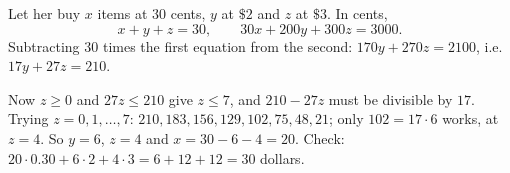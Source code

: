 Let her buy $x$ items at $30$ cents, $y$ at $\$2$ and $z$ at $\$3$. In cents,
\[
x+y+z=30,\qquad 30x+200y+300z=3000 .
\]
Subtracting $30$ times the first equation from the second: $170y+270z=2100$, i.e.\ $17y+27z=210$.

Now $z\ge0$ and $27z\le210$ give $z\le7$, and $210-27z$ must be divisible by $17$. Trying $z=0,1,\dots,7$: $210,183,156,129,102,75,48,21$; only $102=17\cdot6$ works, at $z=4$. So $y=6$, $z=4$ and $x=30-6-4=\boxed{20}$. Check: $20\cdot0.30+6\cdot2+4\cdot3=6+12+12=30$ dollars.
